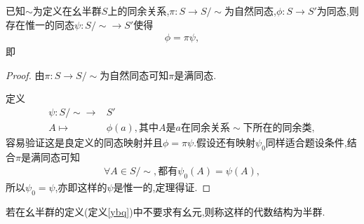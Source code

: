 \begin{theorem}
    已知$\sim$为定义在幺半群$S$上的同余关系,$\pi:S\to S/\sim$为自然同态,$\phi:S\to S'$为同态,则存在惟一的同态$\psi:S/\sim\to S'$使得\begin{align*}
        \phi=\pi\psi,
    \end{align*}即\begin{center}
    \end{center}
\end{theorem}
\begin{proof}
    由$\pi:S\to S/\sim$为自然同态可知$\pi$是满同态.
    
    定义\begin{align*}
        \psi:S/\sim\to&S'\\
        A\mapsto&\phi(a),\text{其中$A$是$a$在同余关系$\sim$下所在的同余类},
    \end{align*}容易验证这是良定义的同态映射并且$\phi=\pi\psi$.假设还有映射$\psi_0$同样适合题设条件,结合$\pi$是满同态可知\begin{align*}
        \forall A\in S/\sim,\text{都有$\psi_0(A)=\psi(A)$},
    \end{align*}所以$\psi_0=\psi$,亦即这样的$\psi$是惟一的,定理得证.
\end{proof}
\begin{definition}[半群]
    若在幺半群的定义(定义\ref{ybq})中不要求有幺元,则称这样的代数结构为半群.
\end{definition}